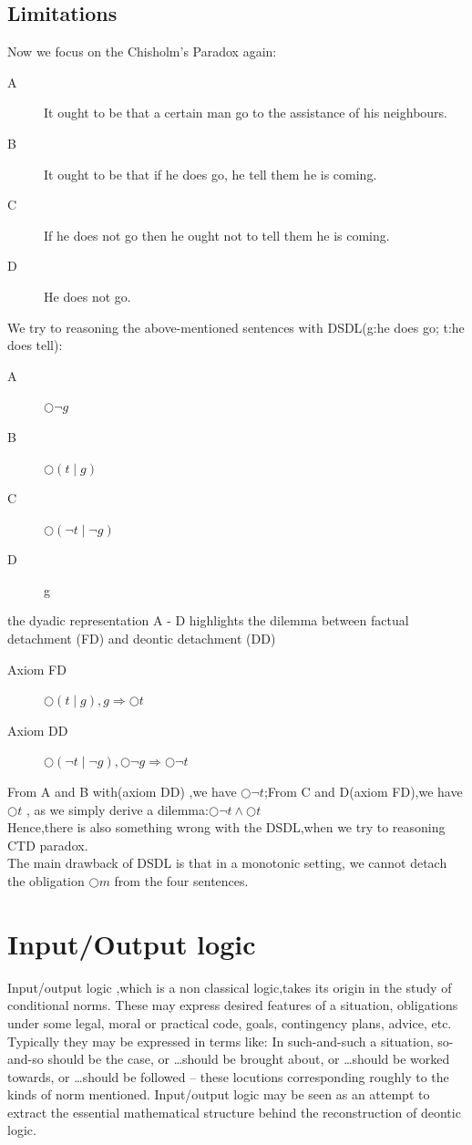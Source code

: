 \documentclass{article}
\begin{document}
\subsection{Limitations}
Now we focus on the Chisholm's Paradox again:
\begin{description}
\item[A]It ought to be that a certain man go to the assistance of his neighbours.
\item[B]It ought to be that if he does go, he tell them he is coming.
\item[C]If he does not go then he ought not to tell them he is coming.
\item[D]He does not go.

\end{description}
We try to reasoning the above-mentioned sentences with DSDL(g:he does go; t:he does tell):
\begin{description}
\item[A]$\bigcirc \neg g$
\item[B]$\bigcirc(t \mid  g)$
\item[C]$\bigcirc(\neg t\mid \neg g)$
\item[D]g
\end{description}
the dyadic representation A - D highlights the dilemma between factual detachment (FD) and deontic detachment (DD)
\begin{description}
\item[Axiom FD]$\bigcirc(t\mid g),g \Rightarrow \bigcirc t$\\
\item[Axiom DD]$\bigcirc(\neg t \mid \neg g), \bigcirc\neg g \Rightarrow \bigcirc\neg t$\\
\end{description}

From A and B with(axiom DD) ,we have $\bigcirc\neg  t$;From C and D(axiom FD),we have $\bigcirc t$ , as we simply derive a dilemma:$\bigcirc\neg t\wedge\bigcirc t$\\
Hence,there is also something wrong with the DSDL,when we try to reasoning CTD paradox.\\
The main drawback of DSDL is that in a monotonic setting, we cannot detach
the obligation $\bigcirc m$ from the four sentences.

\section{Input/Output logic}
Input/output logic\cite{5} ,which  is a non classical logic,takes its origin in the study of conditional norms. These may express desired features of a situation, obligations under some legal, moral or practical code, goals, contingency plans, advice, etc. Typically they may be expressed in terms like: In such-and-such a situation, so-and-so should be the case, or …should be brought about, or …should be worked towards, or …should be followed – these locutions corresponding roughly to the kinds of norm mentioned.
 Input/output logic may be seen as an attempt to extract the essential mathematical structure behind the reconstruction of deontic logic.\\
\end{document}
